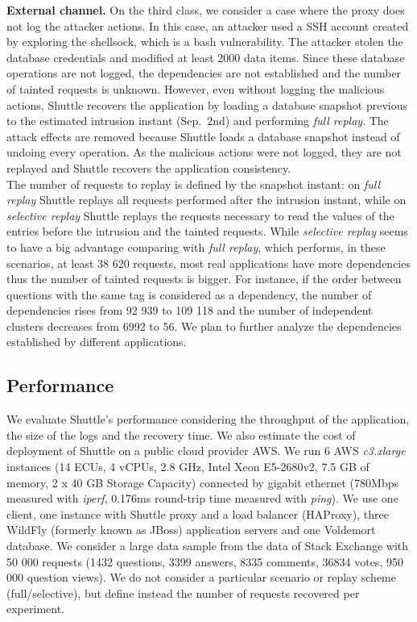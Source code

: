 \textbf{External channel.}
On the third class, we consider a case where the proxy does not log the attacker actions. In this case, an attacker used a SSH account created by exploring the shellsock, which is a bash vulnerability. The attacker stolen the database credentials and modified at least 2000 data items. Since these database operations are not logged, the dependencies are not established and the number of tainted requests is unknown. However, even without logging the malicious actions, Shuttle recovers the application by loading a database snapshot previous to the estimated intrusion instant (Sep.~2nd) and performing \textit{full replay}. The attack effects are removed because Shuttle loads a database snapshot instead of undoing every operation. As the malicious actions were not logged, they are not replayed and Shuttle recovers the application consistency.\\


The number of requests to replay is defined by the snapshot instant: on \textit{full replay} Shuttle replays all requests performed after the intrusion instant, while on \textit{selective replay} Shuttle replays the requests necessary to read the values of the entries before the intrusion and the tainted requests. While  \textit{selective replay} seems to have a big advantage comparing with  \textit{full replay}, which performs, in these scenarios, at least 38 620 requests, most real applications have more dependencies thus the number of tainted requests is bigger. For instance, if the order between questions with the same tag is considered as a dependency,  the number of dependencies rises from 92 939 to 109 118 and the number of independent clusters decreases from 6992 to 56. We plan to further analyze the dependencies established by different applications. 



\subsection{Performance}
\label{sec:evaluation:performance}

We evaluate Shuttle's performance considering the throughput of the application, the size of the logs and the recovery time. We also estimate the cost of deployment of Shuttle on a public cloud provider \acf{AWS}. We run 6 \ac{AWS} \textit{c3.xlarge} instances (14 ECUs, 4 vCPUs, 2.8 GHz, Intel Xeon E5-2680v2, 7.5 GB of memory, 2 x 40 GB Storage Capacity) connected by gigabit ethernet (780Mbps measured with \emph{iperf}, 0.176ms round-trip time measured with \emph{ping}). We use one client, one instance with Shuttle proxy and a load balancer (HAProxy), three WildFly (formerly known as JBoss) application servers and one Voldemort database. We consider a large data sample from the data of Stack Exchange with 50 000 requests (1432 questions, 3399 answers, 8335 comments, 36834 votes, 950 000 question views). We do not consider a particular scenario or replay scheme (full/selective), but define instead the number of requests recovered per experiment.

